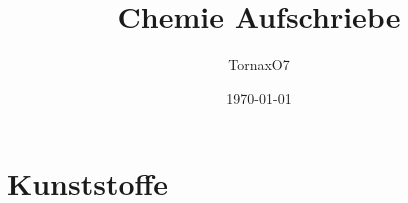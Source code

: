 \documentclass[a4paper, 12pt]{scrartcl}
\title{Chemie Aufschriebe}
\author{TornaxO7}
\date{\today}
\begin{document}
\maketitle
\tableofcontents
\section{Kunststoffe}





%
\end{document}
